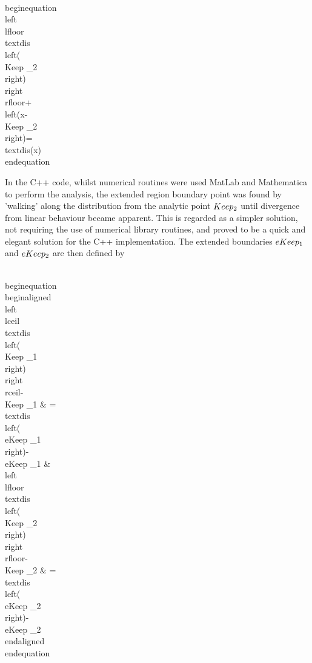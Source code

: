 \\begin{equation}
\\left\\lfloor\\text{dis}\\left(\\Keep _2\\right)\\right\\rfloor+\\left(x-\\Keep _2\\right)=\\text{dis}(x)
\\end{equation}

In the C++ code, whilst numerical routines were used  MatLab and Mathematica to perform the analysis, the extended region boundary point was found by 'walking' along the distribution from the analytic point $\\Keep_2$  until divergence from linear behaviour became apparent. This is regarded as a simpler solution, not requiring the use of numerical library routines, and proved to be a quick and elegant solution for the C++ implementation. The extended boundaries $\\eKeep_1$ and $\\eKeep_2$ are then defined by

\\begin{equation}
\\begin{aligned}
\\left\\lceil\\text{dis}\\left(\\Keep _1\\right)\\right\\rceil-\\Keep _1 & =\\text{dis}\\left(\\eKeep _1\\right)- \\eKeep _1 &
\\left\\lfloor\\text{dis}\\left(\\Keep _2\\right)\\right\\rfloor-\\Keep _2 & =\\text{dis}\\left(\\eKeep _2\\right)- \\eKeep _2 
\\end{aligned}
\\end{equation}

